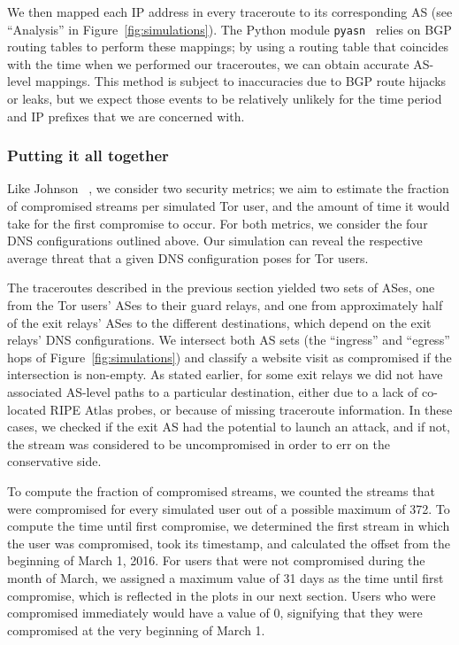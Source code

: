 We then mapped each IP address in every traceroute to its corresponding AS (see
``Analysis'' in Figure~\ref{fig:simulations}).  The
Python module {\tt pyasn}~\cite{pyasn} relies on BGP routing tables to perform
these mappings; by using a routing table that coincides with the time when we
performed our traceroutes, we can obtain accurate AS-level mappings.  This
method is subject to inaccuracies due to BGP route hijacks or leaks, but we
expect those events to be relatively unlikely for the time period and IP
prefixes that we are concerned with.

\subsubsection{Putting it all together}
Like Johnson \ea~\cite[\S~4.2]{Johnson2013a}, we consider two security metrics;
we aim to estimate \first the fraction of compromised streams per simulated Tor
user, and \second the amount of time it would take for the first compromise to
occur.  For both metrics, we consider the four DNS configurations outlined
above.  Our simulation can reveal the respective average threat that a given DNS
configuration poses for Tor users.

The traceroutes described in the previous section yielded two sets of ASes, one
from the Tor users' ASes to their guard relays, and one from approximately half
of the exit relays' ASes to the different destinations, which depend on the exit
relays' DNS configurations.  We intersect both AS sets (the ``ingress'' and
``egress'' hops of Figure~\ref{fig:simulations}) and classify a website visit as
compromised if the intersection is non-empty.  As stated earlier, for some exit
relays we did not have associated AS-level paths to a particular destination,
either due to a lack of co-located RIPE Atlas probes, or because of missing
traceroute information.  In these cases, we checked if the exit AS had the
potential to launch an attack, and if not, the stream was considered to be
uncompromised in order to err on the conservative side.

To compute the fraction of compromised streams, we counted the streams that were
compromised for every simulated user out of a possible maximum of 372. To
compute the time until first compromise, we determined the first stream in which
the user was compromised, took its timestamp, and calculated the offset from the
beginning of March 1, 2016.  For users that were not compromised during the
month of March, we assigned a maximum value of 31 days as the time until first
compromise, which is reflected in the plots in our next section.  Users who were
compromised immediately would have a value of 0, signifying that they were
compromised at the very beginning of March 1.

